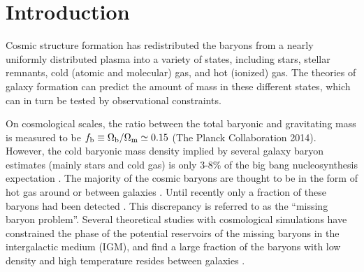 \documentclass[useAMS,usenatbib]{mn2e}
\begin{document}
\setcounter{footnote}{1}


\section{Introduction}
\label{sec:intro}
Cosmic structure formation has redistributed the baryons from  a
nearly uniformly distributed plasma into a variety of states,
including stars, stellar remnants, cold (atomic and molecular) gas,
and hot (ionized) gas. The theories of galaxy formation can predict
the amount of mass in these different states, which can in turn be
tested by observational constraints.  

On cosmological scales, the ratio between the total baryonic and
gravitating mass is measured to be $f_{\rm b}\equiv \Omega_{\rm
  b}/\Omega_{\rm m}\simeq 0.15$ (The Planck Collaboration 2014).
However, the cold baryonic mass density implied by several galaxy
baryon estimates (mainly stars and cold gas) is only 3-8\% of
the big bang nucleosynthesis expectation \citep{Persic92, Fukugita98,
  Bell03, McGaugh10}.  The majority of the cosmic baryons are thought
to be in the form of hot gas around or between galaxies
\citep{Cen09}. Until recently only a fraction of these baryons had
been detected \citep{Bregman07, Shull12}.  This discrepancy is
referred to as the ``missing baryon problem''.  Several theoretical
studies with cosmological simulations have constrained the phase of
the potential reservoirs of the missing baryons in the
  intergalactic medium (IGM), and find a large fraction of the baryons
  with low density and high temperature resides between galaxies
\citep{Yoshida05, He05, Dave10, Zhu11, Haider16}.
\end{document}

